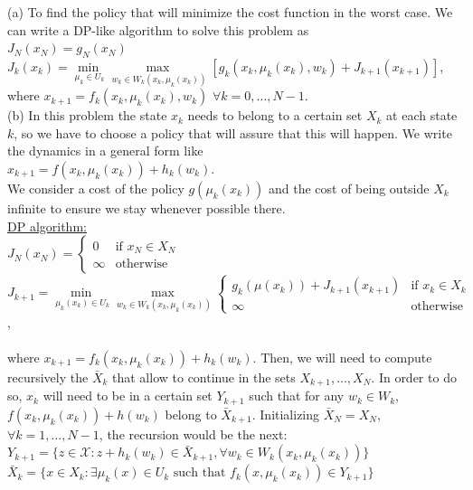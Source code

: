\documentclass[11pt, english]{article}
\begin{document}
(a) To find the policy that will minimize the cost function in the worst case. We can write a DP-like algorithm to solve this problem as\\
$J_N(x_N)=g_N(x_N)$\\
$J_k(x_k)=\underset{\mu_k\in U_k}{\min\ }\underset{w_k\in W_k(x_k,\mu_k(x_k))}{\max\ }[g_k(x_k,\mu_k(x_k),w_k)+J_{k+1}(x_{k+1})]$, where $x_{k+1}=f_k(x_k,\mu_k(x_k),w_k)$ $\forall k=0,\dots, N-1$.\\

(b) In this problem the state $x_k$ needs to belong to a certain set $X_k$ at each state $k$, so we have to choose a policy that will assure that this will happen. We write the dynamics in a general form like \\
$x_{k+1}=f(x_k,\mu_k(x_k))+h_k(w_k)$.\\
We consider a cost of the policy $g(\mu_k(x_k))$ and the cost of being outside $X_k$ infinite to ensure we stay whenever possible there.\\

\underline{DP algorithm:}\\

$J_N(x_N)=\left\{\begin{array}{ll}
0 & \text{if }x_N\in X_N\\
\infty & \text{otherwise}
\end{array}\right.$\\
$J_{k+1}=\underset{\mu_k(x_k)\in U_k}{\min\ }\underset{w_k\in W_k(x_k,\mu_k(x_k))}{\max\ }\left\{\begin{array}{ll}
g_k(\mu(x_k))+J_{k+1}(x_{k+1}) & \text{if } x_k\in X_k\\
\infty & \text{otherwise}
\end{array}\right.$,\\\\ where $x_{k+1}=f_k(x_k,\mu_k(x_k))+h_k(w_k)$. Then, we will need to compute recursively the $\bar{X}_k$ that allow to continue in the sets $X_{k+1},\dots,X_N$. In order to do so, $x_k$ will need to be in a certain set $Y_{k+1}$ such that for any $w_k\in W_k$, $f(x_k,\mu_k(x_k))+h(w_k)$ belong to $\bar{X}_{k+1}$. Initializing $\bar{X}_N=X_N$, $\forall k=1,\dots,N-1$, the recursion would be the next:\\

$Y_{k+1}=\{z\in \mathcal{X}: z+h_k(w_k)\in\bar{X}_{k+1},\forall w_k\in W_k(x_k,\mu_k(x_k))\}$\\

$\bar{X}_k=\{x\in X_k: \exists \mu_k(x)\in U_k\text{ such that }  f_k(x,\mu_k(x_k))\in Y_{k+1}\}$
\end{document}
